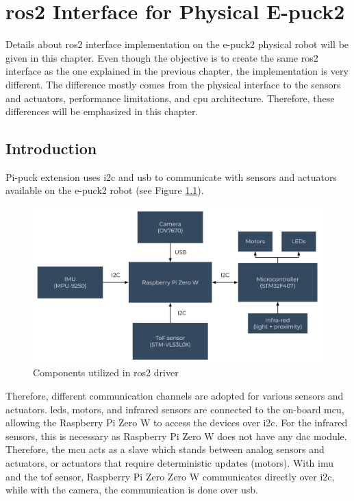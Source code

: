 \chapter{\acs{ros2} Interface for Physical E-puck2}
\label{chap:physical}

Details about \ac{ros2} interface implementation on the e-puck2 physical robot will be given in this chapter.
Even though the objective is to create the same \ac{ros2} interface as the one explained in the previous chapter, the implementation is very different.
The difference mostly comes from the physical interface to the sensors and actuators, performance limitations, and \ac{cpu} architecture.
Therefore, these differences will be emphasized in this chapter.

\section{Introduction}

Pi-puck extension uses \ac{i2c} and \ac{usb} to communicate with sensors and actuators available on the e-puck2 robot (see Figure \ref{fig:physical:general}).

\begin{figure}[H]
    \centering
    \includegraphics[width=\textwidth]{physical/figures/general.pdf}
    \caption{Components utilized in \ac{ros2} driver}
    \label{fig:physical:general}
\end{figure}

Therefore, different communication channels are adopted for various sensors and actuators.
\acp{led}, motors, and infrared sensors are connected to the on-board \ac{mcu}, allowing the Raspberry Pi Zero W to access the devices over \ac{i2c}.
For the infrared sensors, this is necessary as Raspberry Pi Zero W does not have any \ac{dac} module. 
Therefore, the \ac{mcu} acts as a slave which stands between analog sensors and actuators, or actuators that require deterministic updates (motors).
With \ac{imu} and the \ac{tof} sensor, Raspberry Pi Zero Zero W communicates directly over \ac{i2c}, while with the camera, the communication is done over \ac{usb}. 


